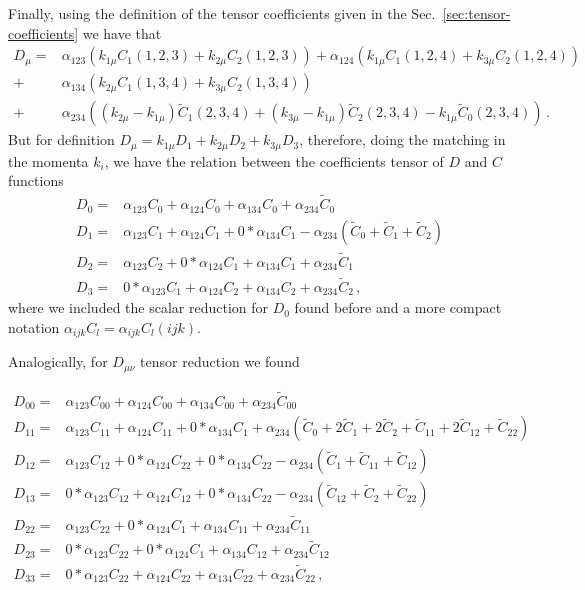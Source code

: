 Finally, using the definition of the tensor coefficients given in the Sec.~\ref{sec:tensor-coefficients} we have that
%
\begin{align}
D_{\mu}=&\alpha_{123}\left(k_{1\mu}C_1(1,2,3)+k_{2\mu}C_2(1,2,3)\right)
+\alpha_{124}\left(k_{1\mu}C_1(1,2,4)+k_{3\mu}C_2(1,2,4)\right)\nonumber \\
+&\alpha_{134}\left(k_{2\mu}C_1(1,3,4)+k_{3\mu}C_2(1,3,4)\right)\nonumber \\
+&\alpha_{234}\left((k_{2\mu}-k_{1\mu})\tilde{C}_1(2,3,4)+(k_{3\mu}-k_{1\mu})\tilde{C}_2(2,3,4)-k_{1\mu}\tilde{C}_0(2,3,4)\right)\,.
\end{align}
%
But for definition $D_{\mu}=k_{1\mu}D_1+k_{2\mu}D_2+k_{3\mu}D_3$, therefore, doing the matching in the momenta $k_i$, we have the relation between the coefficients tensor of $D$ and $C$ functions
\begin{align}
\label{eq:Di-reduction}
D_0=& \alpha_{123}C_0+\alpha_{124}C_0+\alpha_{134}C_0+\alpha_{234}\tilde{C}_0\nonumber \\
D_1=&\alpha_{123}C_1+\alpha_{124}C_1+0*\alpha_{134}C_1-\alpha_{234}\left(\tilde{C}_0+\tilde{C}_1+\tilde{C}_2\right)\nonumber \\
D_2=&\alpha_{123}C_2+0*\alpha_{124}C_1+\alpha_{134}C_1+\alpha_{234}\tilde{C}_1\nonumber \\
D_3=&0*\alpha_{123}C_1+\alpha_{124}C_2+\alpha_{134}C_2+\alpha_{234}\tilde{C}_2\,,
\end{align}
where we included the scalar reduction for $D_0$ found before and a more compact notation $\alpha_{ijk}C_l=\alpha_{ijk}C_l(ijk)$.

Analogically, for $D_{\mu\nu}$ tensor reduction we found

\begin{align}
\label{eq:Dij-reduction}
D_{00}=& \alpha_{123}C_{00}+\alpha_{124}C_{00}+\alpha_{134}C_{00}+\alpha_{234}\tilde{C}_{00}\nonumber \\
D_{11}=&\alpha_{123}C_{11}+\alpha_{124}C_{11}+0*\alpha_{134}C_1+\alpha_{234}\left(\tilde{C}_0+2\tilde{C}_1+2\tilde{C}_2+\tilde{C}_{11}+2\tilde{C}_{12}+\tilde{C}_{22}\right)\nonumber \\
D_{12}=&\alpha_{123}C_{12}+0*\alpha_{124}C_{22}+0*\alpha_{134}C_{22}-\alpha_{234}\left(\tilde{C}_{1}+\tilde{C}_{11}+\tilde{C}_{12}\right)\nonumber\\
D_{13}=&0*\alpha_{123}C_{12}+\alpha_{124}C_{12}+0*\alpha_{134}C_{22}-\alpha_{234}\left(\tilde{C}_{12}+\tilde{C}_{2}+\tilde{C}_{22}\right)\nonumber\\
D_{22}=&\alpha_{123}C_{22}+0*\alpha_{124}C_1+\alpha_{134}C_{11}+\alpha_{234}\tilde{C}_{11}\nonumber \\
D_{23}=&0*\alpha_{123}C_{22}+0*\alpha_{124}C_1+\alpha_{134}C_{12}+\alpha_{234}\tilde{C}_{12}\nonumber \\
D_{33}=&0*\alpha_{123}C_{22}+\alpha_{124}C_{22}+\alpha_{134}C_{22}+\alpha_{234}\tilde{C}_{22}\,,
\end{align}

